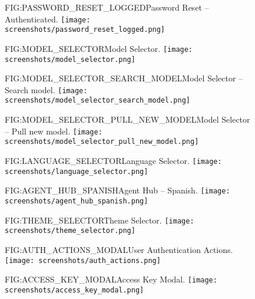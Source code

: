 \begin{figure}[Password Reset -- Authenticated]{FIG:PASSWORD_RESET_LOGGED}{Password Reset -- Authenticated.}
    \texttt{[image: screenshots/password\_reset\_logged.png]}
\end{figure}

\begin{figure}[Model Selector]{FIG:MODEL_SELECTOR}{Model Selector.}
    \texttt{[image: screenshots/model\_selector.png]}
\end{figure}

\begin{figure}[Model Selector -- Search model]{FIG:MODEL_SELECTOR_SEARCH_MODEL}{Model Selector -- Search model.}
    \texttt{[image: screenshots/model\_selector\_search\_model.png]}
\end{figure}

\begin{figure}[Model Selector -- Pull new model]{FIG:MODEL_SELECTOR_PULL_NEW_MODEL}{Model Selector -- Pull new model.}
    \texttt{[image: screenshots/model\_selector\_pull\_new\_model.png]}
\end{figure}

\begin{figure}[Language Selector]{FIG:LANGUAGE_SELECTOR}{Language Selector.}
    \texttt{[image: screenshots/language\_selector.png]}
\end{figure}

\begin{figure}[Agent Hub -- Spanish]{FIG:AGENT_HUB_SPANISH}{Agent Hub -- Spanish.}
    \texttt{[image: screenshots/agent\_hub\_spanish.png]}
\end{figure}

\begin{figure}[Theme Selector]{FIG:THEME_SELECTOR}{Theme Selector.}
    \texttt{[image: screenshots/theme\_selector.png]}
\end{figure}

\begin{figure}[User Authentication Actions]{FIG:AUTH_ACTIONS_MODAL}{User Authentication Actions.}
    \texttt{[image: screenshots/auth\_actions.png]}
\end{figure}

\begin{figure}[Access Key Modal]{FIG:ACCESS_KEY_MODAL}{Access Key Modal.}
    \texttt{[image: screenshots/access\_key\_modal.png]}
\end{figure}
